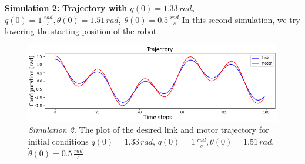 \documentclass[a4paper]{article}
\begin{document}
\textbf{Simulation 2:} \textbf{Trajectory with $q(0)=1.33\, rad$, $\dot{q}(0)=1\, \frac{rad}{s}, \theta(0)=1.51\, rad$, $\dot{\theta}(0)=0.5\, \frac{rad}{s}$}
In this second simulation, we try lowering the starting position of the robot

\begin{figure}
    \centering
    \includegraphics[scale=0.7]{img/final_results/elastic/300_2/76l_87m/traj_76_87.png}
    \caption{\textit{Simulation 2}. The plot of the desired link and motor trajectory for initial conditions $q(0)=1.33\, rad$, $\dot{q}(0)=1\, \frac{rad}{s}, \theta(0)=1.51\, rad$, $\dot{\theta}(0)=0.5\, \frac{rad}{s}$}
    \label{fig:desired_elastic_76_87}
\end{figure}
\end{document}
